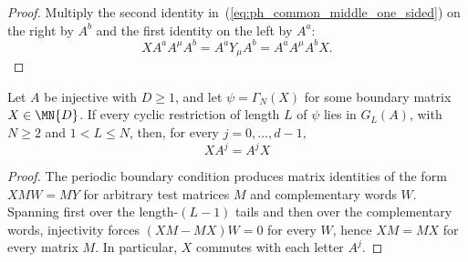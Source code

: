 \begin{proof}
    \leanok
    Multiply the second identity in~(\ref{eq:ph_common_middle_one_sided}) on the
    right by $A^b$ and the first identity on the left by $A^a$:
    \[
        X A^a A^\mu A^b = A^a Y_\mu A^b
        = A^a A^\mu A^b X.
    \]
\end{proof}

\begin{theorem}%
    \label{thm:boundary_matrix_commutes}
    \leanok
    Let $A$ be injective with $D \ge 1$, and let $\psi = \Gamma_{N}(X)$ for some boundary matrix
    $X \in \MN{D}$. If every cyclic restriction of length $L$ of $\psi$ lies in $G_{L}(A)$,
    with $N \ge 2$ and $1 < L \le N$, then, for every $j = 0,\ldots,d-1$,
    \[
        X A^{j} = A^{j} X
    \]
\end{theorem}

\begin{proof}
    \leanok
    The periodic boundary condition produces matrix identities of the form
    $XMW=MY$ for arbitrary test matrices $M$ and complementary words $W$.
    Spanning first over the length-$(L-1)$ tails and then over the complementary words,
    injectivity forces $(XM-MX)W = 0$ for every $W$, hence $XM = MX$ for every matrix
    $M$. In particular, $X$ commutes with each letter $A^{j}$.
\end{proof}

